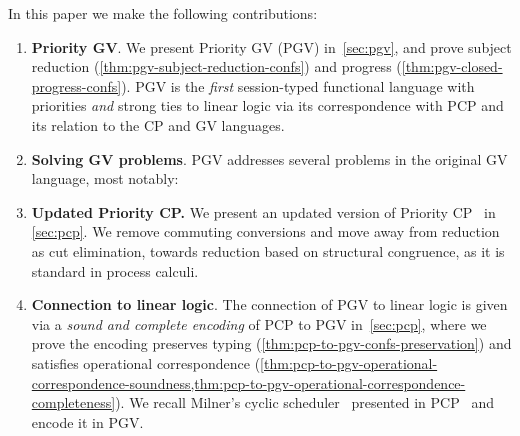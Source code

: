 \documentclass[main.tex]{subfiles}
\begin{document}
In this paper we make the following contributions:
\begin{enumerate}
\item \textbf{Priority GV}. We present Priority GV (PGV) in~\cref{sec:pgv}, and prove subject reduction (\cref{thm:pgv-subject-reduction-confs}) and progress (\cref{thm:pgv-closed-progress-confs}).
PGV is the \emph{first} session-typed functional language with priorities \emph{and} strong ties to linear logic via its correspondence with PCP and its relation to the CP and GV languages.
\item \textbf{Solving GV problems}. PGV addresses several problems in the original GV language, most notably:
\item \textbf{Updated Priority CP.} We present an updated version of Priority CP~\cite{dardhagay18} in \cref{sec:pcp}. We remove commuting conversions and move away from reduction as cut elimination, towards reduction based on structural congruence, as it is standard in process calculi.
\item \textbf{Connection to linear logic}. The connection of PGV to linear logic is given via a \emph{sound and complete encoding} of PCP to PGV in~\cref{sec:pcp}, where we prove the encoding preserves typing (\cref{thm:pcp-to-pgv-confs-preservation}) and satisfies operational correspondence (\cref{thm:pcp-to-pgv-operational-correspondence-soundness,thm:pcp-to-pgv-operational-correspondence-completeness}). We recall Milner's cyclic scheduler~\cite{milner89} presented in PCP~\cite{dardhagay18} and encode it in PGV.
\end{enumerate}
\end{document}
